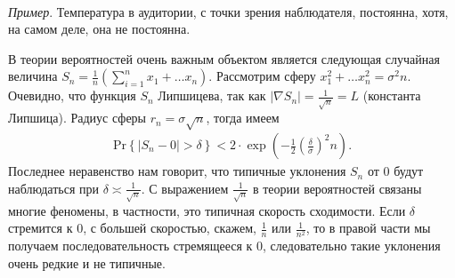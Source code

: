 \documentclass[12pt]{article}
\begin{document}
\begin{itemize}
\begin{eqnarray}
\end{eqnarray}
\par {\it Пример}. Температура в аудитории, с точки зрения наблюдателя, постоянна, хотя, на самом деле, она не постоянна.  
\par В теории вероятностей очень важным объектом является следующая случайная величина $S_n = \frac 1 n \left(\sum_{i=1}^n x_1 + \dots x_n \right)$. Рассмотрим сферу $x_1^2 + \dots x_n^2 = \sigma^2 n$. Очевидно, что функция $S_n$ Липшицева, так как $|\nabla S_n| = \frac 1 {\sqrt{n}} = L$ (константа Липшица). Радиус сферы $r_n = \sigma \sqrt{n}$, тогда имеем
\begin{eqnarray}
\text{Pr}\left\{|S_n - 0| > \delta \right\} < 2 \cdot \exp\left({-\frac 1 2 \left(\frac{\delta}{\sigma}\right)^2 n}\right).
\end{eqnarray}
Последнее неравенство нам говорит, что типичные уклонения $S_n$ от $0$ будут наблюдаться при $\delta \asymp \frac 1{\sqrt{n}}$. С выражением $\frac 1{\sqrt{n}}$ в теории вероятностей связаны многие феномены, в частности, это типичная скорость сходимости. Если $\delta$ стремится к 0, с большей скоростью, скажем, $\frac 1 n$ или $\frac 1 {n^2}$, то в правой части мы получаем последовательность стремящееся к 0, следовательно такие уклонения очень редкие и не типичные. 
\end{itemize}
\end{document}
